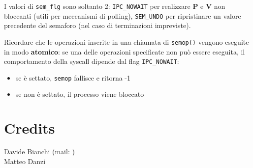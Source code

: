 \documentclass[a4paper, 10pt]{article}
\begin{document}
I valori di \verb|sem_flg| sono soltanto 2: \verb|IPC_NOWAIT| per realizzare \textbf{P} e \textbf{V} non bloccanti (utili per meccanismi di polling), \verb|SEM_UNDO| per ripristinare un valore precedente del semaforo (nel caso di terminazioni impreviste).\newpage

Ricordare che le operazioni inserite in una chiamata di \verb|semop()| vengono eseguite in modo \textbf{atomico}: se una delle operazioni specificate non può essere eseguita, il comportamento della syscall dipende dal flag \verb|IPC_NOWAIT|:
\begin{itemize}
\item se è settato, \verb|semop| fallisce e ritorna -1
\item se non è settato, il processo viene bloccato
\end{itemize}
\newpage

\section{Credits}
Davide Bianchi (mail: ) \\
Matteo Danzi
\end{document}
